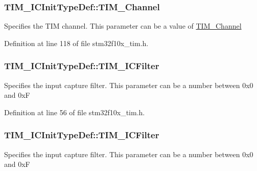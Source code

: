 \subsubsection[{\texorpdfstring{T\+I\+M\+\_\+\+Channel}{TIM_Channel}}]{ T\+I\+M\+\_\+\+I\+C\+Init\+Type\+Def\+::\+T\+I\+M\+\_\+\+Channel}\hypertarget{struct_t_i_m___i_c_init_type_def_ab9404ee3d95aaa7a478ed99562c736d2}{}\label{struct_t_i_m___i_c_init_type_def_ab9404ee3d95aaa7a478ed99562c736d2}
Specifies the T\+IM channel. This parameter can be a value of \hyperlink{group___t_i_m___channel}{T\+I\+M\+\_\+\+Channel} 

Definition at line 118 of file stm32f10x\+\_\+tim.\+h.

\subsubsection[{\texorpdfstring{T\+I\+M\+\_\+\+I\+C\+Filter}{TIM_ICFilter}}]{ T\+I\+M\+\_\+\+I\+C\+Init\+Type\+Def\+::\+T\+I\+M\+\_\+\+I\+C\+Filter}\hypertarget{struct_t_i_m___i_c_init_type_def_a6816e1c2479bd97b0d2d2f603973d917}{}\label{struct_t_i_m___i_c_init_type_def_a6816e1c2479bd97b0d2d2f603973d917}
Specifies the input capture filter. This parameter can be a number between 0x0 and 0xF 

Definition at line 56 of file stm32f10x\+\_\+tim.\+h.

\subsubsection[{\texorpdfstring{T\+I\+M\+\_\+\+I\+C\+Filter}{TIM_ICFilter}}]{ T\+I\+M\+\_\+\+I\+C\+Init\+Type\+Def\+::\+T\+I\+M\+\_\+\+I\+C\+Filter}\hypertarget{struct_t_i_m___i_c_init_type_def_a72539caa6e965e4fa89e3b21b188cf26}{}\label{struct_t_i_m___i_c_init_type_def_a72539caa6e965e4fa89e3b21b188cf26}
Specifies the input capture filter. This parameter can be a number between 0x0 and 0xF 

